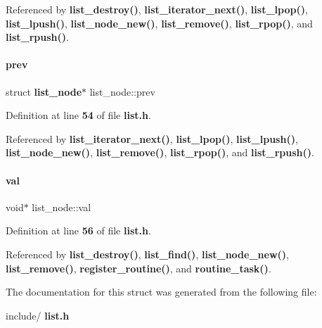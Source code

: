 Referenced by \textbf{ list\+\_\+destroy()}, \textbf{ list\+\_\+iterator\+\_\+next()}, \textbf{ list\+\_\+lpop()}, \textbf{ list\+\_\+lpush()}, \textbf{ list\+\_\+node\+\_\+new()}, \textbf{ list\+\_\+remove()}, \textbf{ list\+\_\+rpop()}, and \textbf{ list\+\_\+rpush()}.

\mbox{\label{structlist__node_a30baba3b27442cbca9694076003ed65e}} 
\paragraph{prev}
{\footnotesize\ttfamily struct \textbf{ list\+\_\+node}$\ast$ list\+\_\+node\+::prev}



Definition at line \textbf{ 54} of file \textbf{ list.\+h}.



Referenced by \textbf{ list\+\_\+iterator\+\_\+next()}, \textbf{ list\+\_\+lpop()}, \textbf{ list\+\_\+lpush()}, \textbf{ list\+\_\+node\+\_\+new()}, \textbf{ list\+\_\+remove()}, \textbf{ list\+\_\+rpop()}, and \textbf{ list\+\_\+rpush()}.

\mbox{\label{structlist__node_a129de89b4c110fa54377ef16ab128ce0}} 
\paragraph{val}
{\footnotesize\ttfamily void$\ast$ list\+\_\+node\+::val}



Definition at line \textbf{ 56} of file \textbf{ list.\+h}.



Referenced by \textbf{ list\+\_\+destroy()}, \textbf{ list\+\_\+find()}, \textbf{ list\+\_\+node\+\_\+new()}, \textbf{ list\+\_\+remove()}, \textbf{ register\+\_\+routine()}, and \textbf{ routine\+\_\+task()}.



The documentation for this struct was generated from the following file\+:\begin{DoxyCompactItemize}
\item 
include/\textbf{ list.\+h}\end{DoxyCompactItemize}
